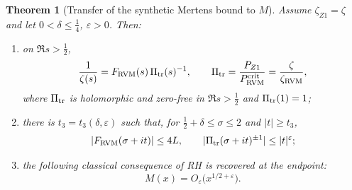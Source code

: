 \documentclass[11pt,reqno]{amsart}
\numberwithin{equation}{section}
\theoremstyle{plain}
\newtheorem{theorem}{Theorem}[section]
\theoremstyle{definition}
\theoremstyle{remark}
\newcommand{\eps}{\varepsilon}
\newcommand{\RVM}{\mathrm{RVM}}
\newcommand{\crit}{\mathrm{crit}}
\begin{document}
\begin{theorem}[Transfer of the synthetic Mertens bound to $M$]\label{thm:transfer}
Assume $\zeta_{Z1}=\zeta$ and let $0<\delta\le\tfrac14$, $\eps>0$.  Then:
\begin{enumerate}[label=\textup{(\roman*)}]
\item on $\Re s>\tfrac12$,
\begin{equation}\label{eq:transfer-factorization}
 \frac1{\zeta(s)}=F_{\RVM}(s)\,\Pi_{\rm tr}(s)^{-1},
 \qquad
 \Pi_{\rm tr}=\frac{P_{Z1}}{P_{\RVM}^{\crit}}=\frac{\zeta}{\zeta_{\RVM}},
\end{equation}
where $\Pi_{\rm tr}$ is holomorphic and zero-free in $\Re s>\tfrac12$ and $\Pi_{\rm tr}(1)=1$;
\item there is $t_3=t_3(\delta,\eps)$ such that, for $\tfrac12+\delta\le\sigma\le2$ and $|t|\ge t_3$,
\begin{equation}\label{eq:transfer-multiplier-bound}
 |F_{\RVM}(\sigma+it)|\le4L,\qquad |\Pi_{\rm tr}(\sigma+it)^{\pm1}|\le|t|^{\eps};
\end{equation}
\item the following classical consequence of RH is recovered at the endpoint:
\begin{equation}\label{eq:transfer-conclusion}
 M(x)=O_\eps\bigl(x^{1/2+\eps}\bigr).
\end{equation}
\end{enumerate}
\end{theorem}
\end{document}
